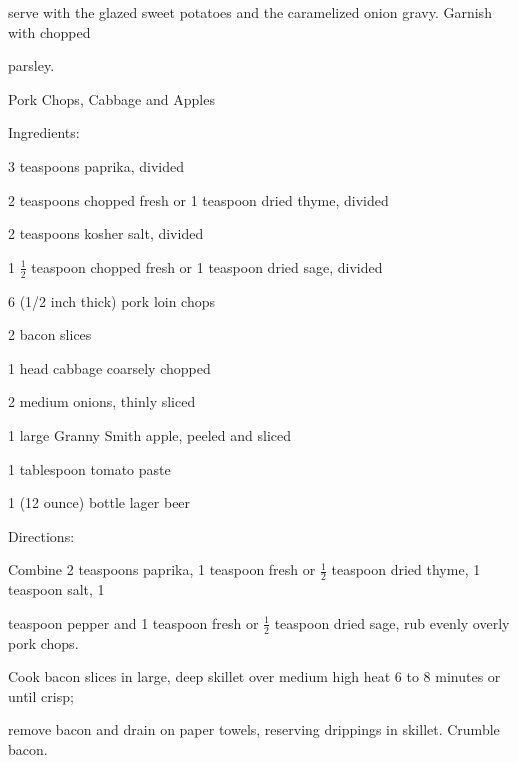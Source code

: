 \documentclass[a4paper,portrait,12pt]{book}
\begin{document}
serve with the glazed sweet potatoes and the caramelized onion gravy. Garnish with chopped




parsley.







\newpage
Pork Chops, Cabbage and Apples




Ingredients:




3 teaspoons paprika, divided




2 teaspoons chopped fresh or 1 teaspoon dried thyme, divided




2 teaspoons kosher salt, divided




1 $\frac{1}{2}$ teaspoon chopped fresh or 1 teaspoon dried sage, divided




6 (1/2 inch thick) pork loin chops




2 bacon slices




1 head cabbage coarsely chopped




2 medium onions, thinly sliced




1 large Granny Smith apple, peeled and sliced




1 tablespoon tomato paste




1 (12 ounce) bottle lager beer




Directions:




Combine 2 teaspoons paprika, 1 teaspoon fresh or $\frac{1}{2}$ teaspoon dried thyme, 1 teaspoon salt, 1




teaspoon pepper and 1 teaspoon fresh or $\frac{1}{2}$ teaspoon dried sage, rub evenly overly pork chops.




Cook bacon slices in large, deep skillet over medium high heat 6 to 8 minutes or until crisp;




remove bacon and drain on paper towels, reserving drippings in skillet. Crumble bacon.
\end{document}

